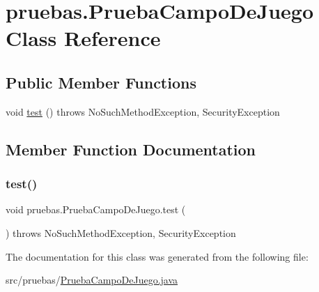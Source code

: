 \hypertarget{classpruebas_1_1_prueba_campo_de_juego}{}\section{pruebas.\+Prueba\+Campo\+De\+Juego Class Reference}
\label{classpruebas_1_1_prueba_campo_de_juego}
\subsection*{Public Member Functions}
\begin{DoxyCompactItemize}
\item 
void \hyperlink{classpruebas_1_1_prueba_campo_de_juego_a8f6235b096dc4e40b2fedbad325486c2}{test} ()  throws No\+Such\+Method\+Exception, Security\+Exception 
\end{DoxyCompactItemize}


\subsection{Member Function Documentation}
\hypertarget{classpruebas_1_1_prueba_campo_de_juego_a8f6235b096dc4e40b2fedbad325486c2}{}\label{classpruebas_1_1_prueba_campo_de_juego_a8f6235b096dc4e40b2fedbad325486c2} 
\subsubsection{\texorpdfstring{test()}{test()}}
{\footnotesize\ttfamily void pruebas.\+Prueba\+Campo\+De\+Juego.\+test (\begin{DoxyParamCaption}{ }\end{DoxyParamCaption}) throws No\+Such\+Method\+Exception, Security\+Exception}



The documentation for this class was generated from the following file\+:\begin{DoxyCompactItemize}
\item 
src/pruebas/\hyperlink{_prueba_campo_de_juego_8java}{Prueba\+Campo\+De\+Juego.\+java}\end{DoxyCompactItemize}
